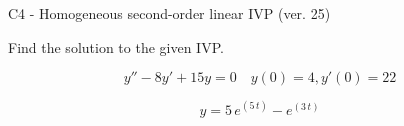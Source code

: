 \begin{exercise}
  \begin{exerciseTitle}C4 - Homogeneous second-order linear IVP (ver. 25)\end{exerciseTitle}
  \begin{exerciseStatement}
    
Find the solution to the given IVP.

    
\[y''-8y'+15y = 0 \hspace{1em} y(0) = 4 , y'(0) = 22\]

  \end{exerciseStatement}
  \begin{exerciseAnswer}
    
\[y= 5 \, e^{\left(5 \, t\right)} - e^{\left(3 \, t\right)}\]

  \end{exerciseAnswer}
\end{exercise}